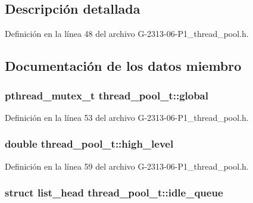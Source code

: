 \subsection{Descripción detallada}


Definición en la línea 48 del archivo G-\/2313-\/06-\/\+P1\+\_\+thread\+\_\+pool.\+h.



\subsection{Documentación de los datos miembro}
\subsubsection[{\texorpdfstring{global}{global}}]{\setlength{\rightskip}{0pt plus 5cm}pthread\+\_\+mutex\+\_\+t thread\+\_\+pool\+\_\+t\+::global}\hypertarget{structthread__pool__t_aaa6e0a9d9c28c3f9be7eccbe8003af23}{}\label{structthread__pool__t_aaa6e0a9d9c28c3f9be7eccbe8003af23}


Definición en la línea 53 del archivo G-\/2313-\/06-\/\+P1\+\_\+thread\+\_\+pool.\+h.

\subsubsection[{\texorpdfstring{high\+\_\+level}{high_level}}]{\setlength{\rightskip}{0pt plus 5cm}double thread\+\_\+pool\+\_\+t\+::high\+\_\+level}\hypertarget{structthread__pool__t_aa771fc181f63c16346fff1c7eb0d9014}{}\label{structthread__pool__t_aa771fc181f63c16346fff1c7eb0d9014}


Definición en la línea 59 del archivo G-\/2313-\/06-\/\+P1\+\_\+thread\+\_\+pool.\+h.

\subsubsection[{\texorpdfstring{idle\+\_\+queue}{idle_queue}}]{\setlength{\rightskip}{0pt plus 5cm}struct {\bf list\+\_\+head} thread\+\_\+pool\+\_\+t\+::idle\+\_\+queue}\hypertarget{structthread__pool__t_a38a9fa0d0ea1060d5bbff8421a92c1c7}{}\label{structthread__pool__t_a38a9fa0d0ea1060d5bbff8421a92c1c7}


